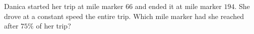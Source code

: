 Danica started her trip at mile marker $66$ and ended it at mile marker $194$. She drove at a constant speed the entire trip. Which mile marker had she reached after $75\%$ of her trip?
